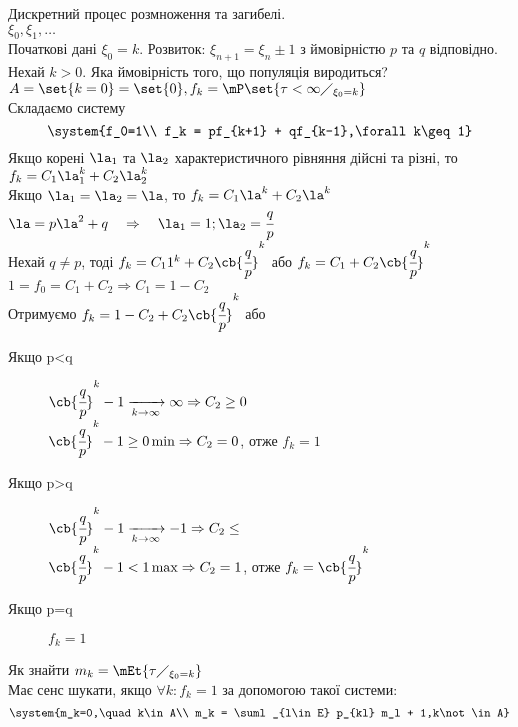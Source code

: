 \begin{exs}
Дискретний процес розмноження та загибелі.\\
$\xi_0,\xi_1,\ldots$\\
Початкові дані $\xi_0=k$. Розвиток: $\xi_{n+1} = \xi_n \pm 1$ з ймовірністю $p$ та $q$ відповідно. \\
Нехай $k>0$. Яка ймовірність того, що популяція виродиться?\\
$A=\set{k=0} = \set{0},f_k = \mP\set{\tau<\infty\diagup_{\xi_0=k}}$\\
Складаємо систему
\begin{equation}
	\system{f_0=1\\ f_k = pf_{k+1} + qf_{k-1},\forall k\geq 1}
\end{equation}
Якщо корені $\la_1$ та $\la_2$ характеристичного рівняння дійсні та різні, то $f_k = C_1 \la_1^k + C_2\la_2^k$\\
Якщо $\la_1=\la_2=\la$, то $f_k=C_1 \la^k + C_2\la^k$\\
$\la=p\la^2 + q\quad\Rightarrow\quad \la_1 = 1;\la_2=\cfrac qp$\\
Нехай $q\neq p$, тоді $f_k = C_11^k + C_2 \cb{\cfrac qp}^k$ або $f_k = C_1 + C_2\cb{\cfrac qp}^k$\\
$1=f_0 = C_1 + C_2 \Rightarrow C_1 = 1 - C_2$\\
Отримуємо $f_k = 1 - C_2 + C_2\cb{\cfrac qp}^k$ або \\
\begin{description}
\item[Якщо p<q] $\cb{\cfrac qp}^k -1\xrightarrow[k\to\infty]{} \infty \Rightarrow C_2\geq 0$\\
	$\cb{\cfrac qp}^k -1\geq 0\min\Rightarrow C_2 = 0$, отже $f_k=1$
\item[Якщо p>q] $\cb{\cfrac qp}^k -1\xrightarrow[k\to\infty]{} -1 \Rightarrow C_2\leq $\\
	$\cb{\cfrac qp}^k -1<1\max\Rightarrow C_2 = 1$, отже $f_k=\cb{\cfrac qp}^k$
\item[Якщо p=q] $f_k=1$
\end{description}
\end{exs}
Як знайти $m_k = \mEt{\tau\diagup_{\xi_0=k}}$\\
Має сенс шукати, якщо $\forall k: f_k=1$ за допомогою такої системи:
\begin{equation}\label{tr:6:2}
	\system{m_k=0,\quad k\in A\\ m_k = \suml_{l\in E} p_{kl} m_l + 1,k\not\in A}
\end{equation}
